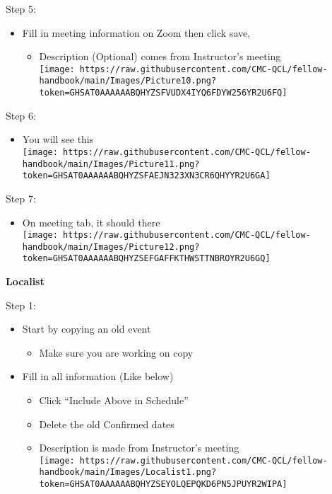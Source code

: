\documentclass[
]{book}
\providecommand{\tightlist}{%
  \setlength{\itemsep}{0pt}\setlength{\parskip}{0pt}}
\begin{document}
Step 5:

\begin{itemize}
\tightlist
\item
  Fill in meeting information on Zoom then click save,

  \begin{itemize}
  \tightlist
  \item
    Description (Optional) comes from Instructor's meeting\\
    \texttt{[image: https://raw.githubusercontent.com/CMC-QCL/fellow-handbook/main/Images/Picture10.png?token=GHSAT0AAAAAABQHYZSFVUDX4IYQ6FDYW256YR2U6FQ]}
  \end{itemize}
\end{itemize}

Step 6:

\begin{itemize}
\tightlist
\item
  You will see this\\
  \texttt{[image: https://raw.githubusercontent.com/CMC-QCL/fellow-handbook/main/Images/Picture11.png?token=GHSAT0AAAAAABQHYZSFAEJN323XN3CR6QHYYR2U6GA]}
\end{itemize}

Step 7:

\begin{itemize}
\tightlist
\item
  On meeting tab, it should there\\
  \texttt{[image: https://raw.githubusercontent.com/CMC-QCL/fellow-handbook/main/Images/Picture12.png?token=GHSAT0AAAAAABQHYZSEFGAFFKTHWSTTNBROYR2U6GQ]}
\end{itemize}

\textbf{Localist}

Step 1:

\begin{itemize}
\tightlist
\item
  Start by copying an old event

  \begin{itemize}
  \tightlist
  \item
    Make sure you are working on copy\\
  \end{itemize}
\item
  Fill in all information (Like below)

  \begin{itemize}
  \tightlist
  \item
    Click ``Include Above in Schedule''\\
  \item
    Delete the old Confirmed dates\\
  \item
    Description is made from Instructor's meeting\\
    \texttt{[image: https://raw.githubusercontent.com/CMC-QCL/fellow-handbook/main/Images/Localist1.png?token=GHSAT0AAAAAABQHYZSEYOLQEPQKD6PN5JPUYR2WIPA]}
  \end{itemize}
\end{itemize}
\end{document}
